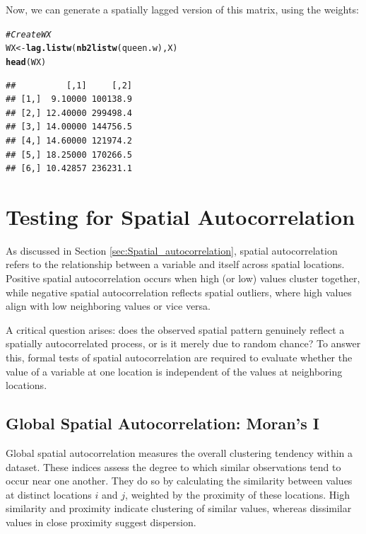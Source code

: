 \documentclass[english,12pt]{book}\usepackage[]{graphicx}\usepackage[]{xcolor}
\makeatletter
\newcommand{\hlcom}[1]{\textcolor[rgb]{0.678,0.584,0.686}{\textit{#1}}}%
\newcommand{\hlstd}[1]{\textcolor[rgb]{0.345,0.345,0.345}{#1}}%
\newcommand{\hlkwb}[1]{\textcolor[rgb]{0.69,0.353,0.396}{#1}}%
\newcommand{\hlkwd}[1]{\textcolor[rgb]{0.737,0.353,0.396}{\textbf{#1}}}%
\newenvironment{kframe}{%
 \def\at@end@of@kframe{}%
 \ifinner\ifhmode%
  \def\at@end@of@kframe{\end{minipage}}%
  \begin{minipage}{\columnwidth}%
 \fi\fi%
 \def\FrameCommand##1{\hskip\@totalleftmargin \hskip-\fboxsep
 \colorbox{shadecolor}{##1}\hskip-\fboxsep
     \hskip-\linewidth \hskip-\@totalleftmargin \hskip\columnwidth}%
 \MakeFramed {\advance\hsize-\width
   \@totalleftmargin\z@ \linewidth\hsize
   \@setminipage}}%
 {\par\unskip\endMakeFramed%
 \at@end@of@kframe}
\newenvironment{knitrout}{}{} %
\makeatother
\begin{document}
Now, we can generate a spatially lagged version of this matrix, using the  weights:

\begin{knitrout}
\color{fgcolor}\begin{kframe}
\begin{alltt}
\hlcom{# Create WX}
\hlstd{WX} \hlkwb{<-} \hlkwd{lag.listw}\hlstd{(}\hlkwd{nb2listw}\hlstd{(queen.w), X)}
\hlkwd{head}\hlstd{(WX)}
\end{alltt}
\begin{verbatim}
##          [,1]     [,2]
## [1,]  9.10000 100138.9
## [2,] 12.40000 299498.4
## [3,] 14.00000 144756.5
## [4,] 14.60000 121974.2
## [5,] 18.25000 170266.5
## [6,] 10.42857 236231.1
\end{verbatim}
\end{kframe}
\end{knitrout}


\section{Testing for Spatial Autocorrelation}

As discussed in Section \ref{sec:Spatial_autocorrelation}, spatial autocorrelation refers to the relationship between a variable and itself across spatial locations. Positive spatial autocorrelation occurs when high (or low) values cluster together, while negative spatial autocorrelation reflects spatial outliers, where high values align with low neighboring values or vice versa.

A critical question arises: does the observed spatial pattern genuinely reflect a spatially autocorrelated process, or is it merely due to random chance? To answer this, formal tests of spatial autocorrelation are required to evaluate whether the value of a variable at one location is independent of the values at neighboring locations.


\subsection{Global Spatial Autocorrelation: Moran's I}\label{sec:moransI}

Global spatial autocorrelation measures the overall clustering tendency within a dataset. These indices assess the degree to which similar observations tend to occur near one another. They do so by calculating the similarity between values at distinct locations $i$ and $j$, weighted by the proximity of these locations. High similarity and proximity indicate clustering of similar values, whereas dissimilar values in close proximity suggest dispersion.
\end{document}
